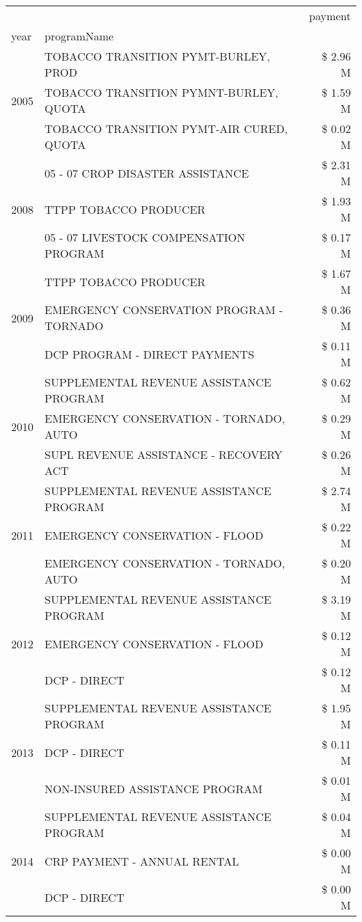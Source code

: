 \begin{tabular}{llr}
\toprule
 &  & payment \\
year & programName &  \\
\midrule
\multirow[t]{3}{*}{2005} & TOBACCO TRANSITION PYMT-BURLEY, PROD & \$ 2.96 M \\
 & TOBACCO TRANSITION PYMNT-BURLEY, QUOTA & \$ 1.59 M \\
 & TOBACCO TRANSITION PYMT-AIR CURED, QUOTA & \$ 0.02 M \\
\cline{1-3}
\multirow[t]{3}{*}{2008} & 05 - 07 CROP DISASTER ASSISTANCE & \$ 2.31 M \\
 & TTPP TOBACCO PRODUCER & \$ 1.93 M \\
 & 05 - 07 LIVESTOCK COMPENSATION PROGRAM & \$ 0.17 M \\
\cline{1-3}
\multirow[t]{3}{*}{2009} & TTPP TOBACCO PRODUCER & \$ 1.67 M \\
 & EMERGENCY CONSERVATION PROGRAM - TORNADO & \$ 0.36 M \\
 & DCP PROGRAM - DIRECT PAYMENTS & \$ 0.11 M \\
\cline{1-3}
\multirow[t]{3}{*}{2010} & SUPPLEMENTAL REVENUE ASSISTANCE PROGRAM & \$ 0.62 M \\
 & EMERGENCY CONSERVATION - TORNADO, AUTO & \$ 0.29 M \\
 & SUPL REVENUE ASSISTANCE - RECOVERY ACT & \$ 0.26 M \\
\cline{1-3}
\multirow[t]{3}{*}{2011} & SUPPLEMENTAL REVENUE ASSISTANCE PROGRAM & \$ 2.74 M \\
 & EMERGENCY CONSERVATION - FLOOD & \$ 0.22 M \\
 & EMERGENCY CONSERVATION - TORNADO, AUTO & \$ 0.20 M \\
\cline{1-3}
\multirow[t]{3}{*}{2012} & SUPPLEMENTAL REVENUE ASSISTANCE PROGRAM & \$ 3.19 M \\
 & EMERGENCY CONSERVATION - FLOOD & \$ 0.12 M \\
 & DCP - DIRECT & \$ 0.12 M \\
\cline{1-3}
\multirow[t]{3}{*}{2013} & SUPPLEMENTAL REVENUE ASSISTANCE PROGRAM & \$ 1.95 M \\
 & DCP - DIRECT & \$ 0.11 M \\
 & NON-INSURED ASSISTANCE PROGRAM & \$ 0.01 M \\
\cline{1-3}
\multirow[t]{3}{*}{2014} & SUPPLEMENTAL REVENUE ASSISTANCE PROGRAM & \$ 0.04 M \\
 & CRP PAYMENT - ANNUAL RENTAL & \$ 0.00 M \\
 & DCP - DIRECT & \$ 0.00 M \\

\end{tabular}
